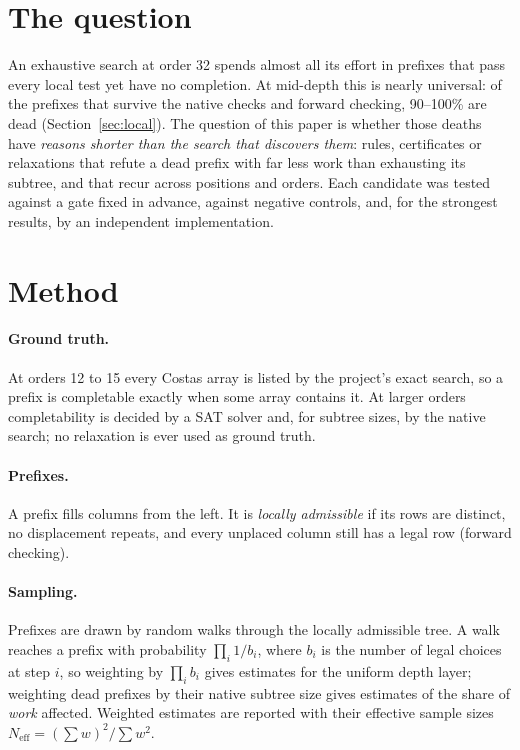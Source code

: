 \section{The question}
\label{sec:question}
An exhaustive search at order 32 spends almost all its effort in prefixes that pass every local test yet have
no completion. At mid-depth this is nearly universal: of the prefixes that survive the native checks and
forward checking, 90--100\% are dead (Section~\ref{sec:local}). The question of this paper is whether those
deaths have \emph{reasons shorter than the search that discovers them}: rules, certificates or relaxations
that refute a dead prefix with far less work than exhausting its subtree, and that recur across positions
and orders. Each candidate was tested against a gate fixed in advance, against negative controls, and,
for the strongest results, by an independent implementation.

\section{Method}
\label{sec:method}
\paragraph{Ground truth.} At orders 12 to 15 every Costas array is listed by the project's exact search, so a
prefix is completable exactly when some array contains it. At larger orders completability is decided by
a SAT solver and, for subtree sizes, by the native search; no relaxation is ever used as ground truth.

\paragraph{Prefixes.} A prefix fills columns from the left. It is \emph{locally admissible} if its rows are
distinct, no displacement repeats, and every unplaced column still has a legal row (forward checking).

\paragraph{Sampling.} Prefixes are drawn by random walks through the locally admissible tree. A walk reaches
a prefix with probability $\prod_i 1/b_i$, where $b_i$ is the number of legal choices at step $i$, so weighting
by $\prod_i b_i$ gives estimates for the uniform depth layer; weighting dead prefixes by their native subtree
size gives estimates of the share of \emph{work} affected. Weighted estimates are reported with their
effective sample sizes $N_{\mathrm{eff}}=(\sum w)^2/\sum w^2$.

